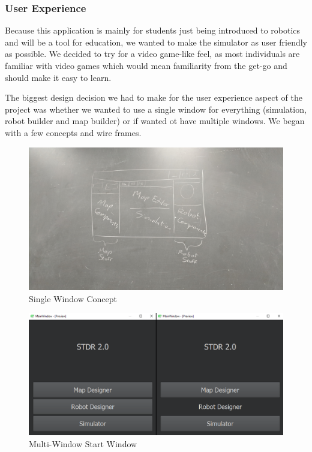  \subsubsection*{User Experience}
	Because this application is mainly for students just being introduced to robotics and will be a tool for education, we wanted to make the simulator as user friendly as possible. We decided to try for a video game-like feel, as most individuals are familiar with video games which would mean familiarity from the get-go and should make it easy to learn. 
	
	The biggest design decision we had to make for the user experience aspect of the project was whether we wanted to use a single window for everything (simulation, robot builder and map builder) or if wanted ot have multiple windows. We began with a few concepts and wire frames. 
	
\begin{figure}
	\begin{center}
	\includegraphics[width=\textwidth]{./images_design/Sams.jpg}
	\caption{Single Window Concept}
	\label{fig:singlewindowconcept}
	\end{center}
\end{figure}

\begin{figure}
	\begin{center}
	\includegraphics[width=\textwidth]{./images_design/MainScreen.png}
	\caption{Multi-Window Start Window}
	\label{fig:mwindowStart}
	\end{center}
\end{figure}

